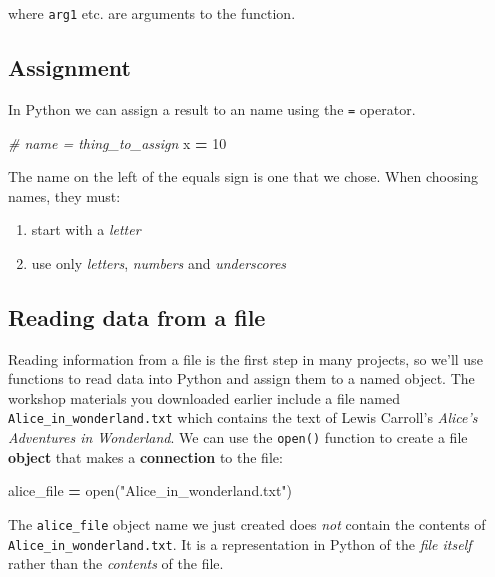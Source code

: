 \documentclass[]{book}
\newenvironment{Shaded}{\begin{snugshade}}{\end{snugshade}}
\newcommand{\BuiltInTok}[1]{#1}
\newcommand{\CommentTok}[1]{\textcolor[rgb]{0.56,0.35,0.01}{\textit{#1}}}
\newcommand{\DecValTok}[1]{\textcolor[rgb]{0.00,0.00,0.81}{#1}}
\newcommand{\NormalTok}[1]{#1}
\newcommand{\OperatorTok}[1]{\textcolor[rgb]{0.81,0.36,0.00}{\textbf{#1}}}
\newcommand{\StringTok}[1]{\textcolor[rgb]{0.31,0.60,0.02}{#1}}
\providecommand{\tightlist}{%
  \setlength{\itemsep}{0pt}\setlength{\parskip}{0pt}}
\begin{document}
where \texttt{arg1} etc. are arguments to the function.

\hypertarget{assignment-1}{%
\subsection{Assignment}\label{assignment-1}}

In Python we can assign a result to an name using the \texttt{=} operator.

\begin{Shaded}
\begin{Highlighting}[]
\CommentTok{# name = thing_to_assign}
\NormalTok{x }\OperatorTok{=} \DecValTok{10}
\end{Highlighting}
\end{Shaded}

The name on the left of the equals sign is one that we chose. When choosing names, they must:

\begin{enumerate}
\def\labelenumi{\arabic{enumi}.}
\tightlist
\item
  start with a \emph{letter}
\item
  use only \emph{letters}, \emph{numbers} and \emph{underscores}
\end{enumerate}

\hypertarget{reading-data-from-a-file}{%
\subsection{Reading data from a file}\label{reading-data-from-a-file}}

Reading information from a file is the first step in many projects, so we'll use functions to read data into Python and assign them to a named object. The workshop materials you downloaded earlier include a file named \texttt{Alice\_in\_wonderland.txt} which contains the text of Lewis Carroll's \emph{Alice's Adventures in Wonderland}. We can use the \texttt{open()} function to create a file \textbf{object} that makes a \textbf{connection} to the file:

\begin{Shaded}
\begin{Highlighting}[]
\NormalTok{alice_file }\OperatorTok{=} \BuiltInTok{open}\NormalTok{(}\StringTok{"Alice_in_wonderland.txt"}\NormalTok{)}
\end{Highlighting}
\end{Shaded}

The \texttt{alice\_file} object name we just created does \emph{not} contain the contents of \texttt{Alice\_in\_wonderland.txt}. It is a representation in Python of the \emph{file itself} rather than the \emph{contents} of the file.
\end{document}
